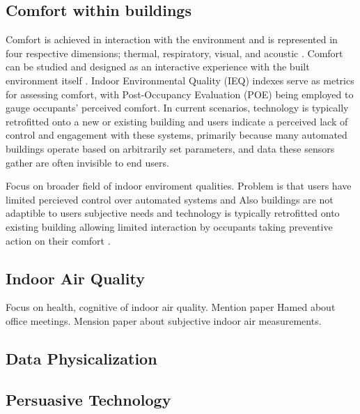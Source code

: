 \subsection{Comfort within buildings}

Comfort is achieved in interaction with the environment and is represented in four respective dimensions; thermal, respiratory, visual, and acoustic \cite{comfort}. Comfort can be studied and designed as an interactive experience with the built environment itself \cite{environment}. Indoor Environmental Quality (IEQ) indexes serve as metrics for assessing comfort, with Post-Occupancy Evaluation (POE) being employed to gauge occupants' perceived comfort. In current scenarios, technology is typically retrofitted onto a new or existing building and users indicate a perceived lack of control and engagement with these systems, primarily because many automated buildings operate based on arbitrarily set parameters, and data these sensors gather are often invisible to end users.

Focus on broader field of indoor enviroment qualities. Problem is that users have limited percieved control over automated systems and  Also buildings are not adaptible to users subjective needs and technology is typically retrofitted onto existing building allowing limited interaction by occupants taking preventive action on their comfort \cite{alavi_comfort_2017}.


\subsection{Indoor Air Quality}

Focus on health, cognitive of indoor air quality. Mention paper Hamed about office meetings. Mension paper about subjective indoor air measurements.


\subsection{Data Physicalization}

\subsection{Persuasive Technology}